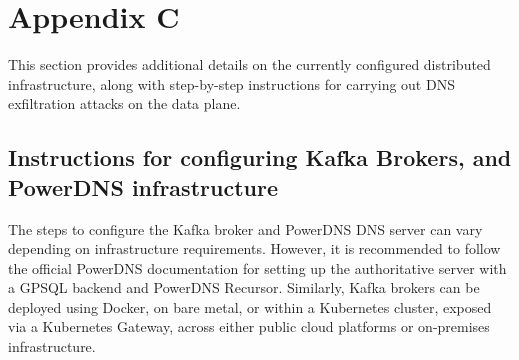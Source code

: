\documentclass [11pt, proquest] {uwthesis}[2020/02/24]
\begin{document}
\section{Appendix C}
This section provides additional details on the currently configured distributed infrastructure, along with step-by-step instructions for carrying out DNS exfiltration attacks on the data plane.

\subsection{Instructions for configuring Kafka Brokers, and PowerDNS infrastructure}
The steps to configure the Kafka broker and PowerDNS DNS server can vary depending on infrastructure requirements. However, it is recommended to follow the official PowerDNS documentation for setting up the authoritative server with a GPSQL backend and PowerDNS Recursor. Similarly, Kafka brokers can be deployed using Docker, on bare metal, or within a Kubernetes cluster, exposed via a Kubernetes Gateway, across either public cloud platforms or on-premises infrastructure.
\end{document}
